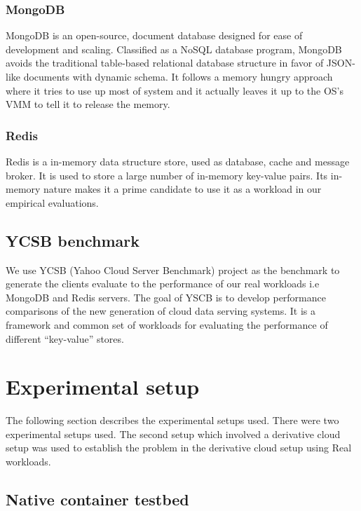       \subsubsection{MongoDB}
	MongoDB \cite{Mongodb} is an open-source, document database designed for ease of development and scaling. Classified as a NoSQL 
database program, MongoDB avoids the traditional table-based relational database structure in favor of JSON-like documents with dynamic 
schema. It follows a memory hungry approach where it tries to use up most of system and it actually leaves it up to the OS's VMM to tell it 
to release the memory.

      \subsubsection{Redis}
	Redis \cite{Redis} is a in-memory data structure store, used as database, cache and message broker. It is used to store a large 
number of in-memory key-value pairs. Its in-memory nature makes it a prime candidate to use it as a workload in our empirical evaluations.
   
    \subsection{YCSB benchmark}
	We use YCSB \cite{cooper2010benchmarking} (Yahoo Cloud Server Benchmark) project as the benchmark to generate the clients evaluate 
to the performance of our real workloads i.e MongoDB and Redis servers. The goal of YSCB is to develop performance comparisons of the new 
generation of cloud data serving systems. It is a framework and common set of workloads for evaluating the performance of different 
“key-value” stores.

  \section{Experimental setup}
  
    The following section describes the experimental setups used. There were two experimental setups used.  The second setup which involved 
a derivative cloud setup was used to establish the problem in the derivative cloud setup using Real workloads.
    
    \subsection{Native container testbed}
      \label{section_testbed_native}
      
